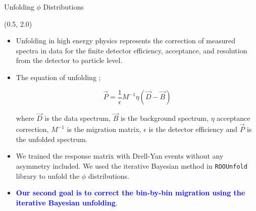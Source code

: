 \documentclass[10pt, xcolor={dvipsnames}, aspectratio = 169]{beamer}
\newcommand{\citeme}[1]{{\tiny \footfullcite{#1}}}
\begin{document}
\begin{frame}[fragile]{Unfolding $\phi$ Distributions}

\begin{textblock}{14.0}(0.5, 2.0)

\begin{itemize}

\item Unfolding in high energy physics represents the correction of measured spectra in data for the finite detector
efficiency, acceptance, and resolution from the detector to particle level.

\item The equation of unfolding ;

\begin{equation*}
\vec{P} = \frac{1}{\epsilon} M^{-1} \eta (\vec{D}-\vec{B})
\end{equation*}

where $\vec{D}$ is the data spectrum, $\vec{B}$ is the background spectrum, $\eta$ acceptance correction, $M^{-1}$ is the migration matrix, $\epsilon$ is the detector efficiency and $\vec{P}$ is the unfolded spectrum.

%

\item We trained the response matrix with Drell-Yan events without any asymmetry included. We used the iterative Bayesian method in \verb|ROOUnfold| library to unfold the $\phi$ distributions. \citeme{Wynne:2012jb}
\item \textcolor{blue}{\textbf{Our second goal is to correct the bin-by-bin migration using the iterative Bayesian unfolding}}.

\end{itemize}

\end{textblock}

\end{frame}

\end{document}
